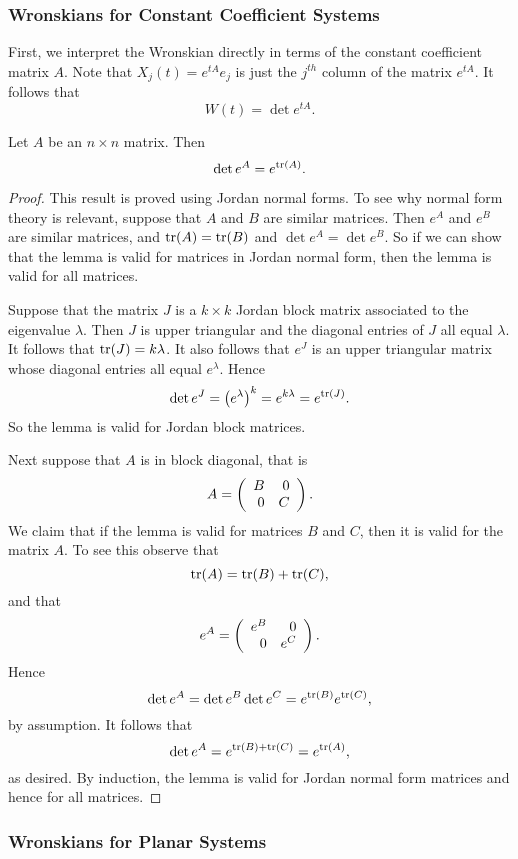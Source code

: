 \documentclass{ximera}
\begin{document}
\subsubsection*{Wronskians for Constant Coefficient Systems}

First, we interpret the Wronskian directly in terms of the constant coefficient 
matrix $A$.  Note that $X_j(t)=e^{tA}e_j$ is just the $j^{th}$ column of the 
matrix $e^{tA}$.   It follows that 
\[
W(t) = \det e^{tA}.
\]

\begin{lemma} 
Let $A$ be an $n\times n$ matrix.  Then
\[
\det e^A = e^{{\rm tr}(A)}.
\]
\end{lemma}

\begin{proof}  This result is proved using 
Jordan normal forms.  To see why normal
form theory is relevant, suppose that $A$ and $B$ are similar matrices.  Then 
$e^A$ and $e^B$ are similar matrices, and ${\rm tr}(A)={\rm tr}(B)$ and 
$\det e^A = \det e^B$.  So if we can show that the lemma is valid for matrices 
in Jordan normal form, then the lemma is valid for all matrices.

Suppose that the matrix $J$ is  a $k\times k$ 
Jordan block matrix associated
to the eigenvalue $\lambda$.  Then $J$ is upper triangular and the 
diagonal entries of $J$ all equal $\lambda$.  
It follows that ${\rm tr}(J)=k\lambda$.
It also follows that $e^J$ is an upper triangular matrix whose diagonal 
entries all equal $e^\lambda$.  Hence
\[
\det e^J = \left(e^\lambda\right)^k = e^{k\lambda} = e^{{\rm tr}(J)}.
\]
So the lemma is valid for Jordan block matrices.

Next suppose that $A$ is in block diagonal, 
that is
\[
A=\left(\begin{array}{rr} B & 0\\ 0 &C\end{array}\right).
\]
We claim that if the lemma is valid for matrices $B$ and $C$, then it 
is valid for the matrix $A$.  To see this observe that 
\[
{\rm tr}(A) = {\rm tr}(B) + {\rm tr}(C),
\]
and that 
\[
e^A = \left(\begin{array}{rr} e^B & 0\\ 0 &e^C\end{array}\right).
\]
Hence 
\[
\det e^A = \det e^B \det e^C = e^{{\rm tr}(B)}e^{{\rm tr}(C)}, 
\]
by assumption.  It follows that 
\[
\det e^A = e^{{\rm tr}(B)+{\rm tr}(C)} = e^{{\rm tr}(A)},
\]
as desired.  By induction,  the lemma is valid for Jordan normal form 
matrices and hence for all matrices.  \end{proof}

\subsubsection*{Wronskians for Planar Systems}
\end{document}
